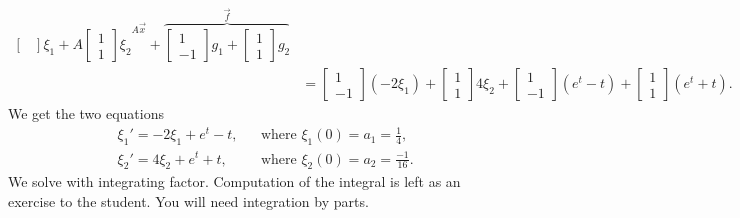 \documentclass{ximera}
\begin{document}
\begin{exampleSol}
\begin{equation*}
\begin{split}
{\begin{bmatrix}
                \end{bmatrix} 
                \xi_1 +
                A
                \begin{bmatrix}
                    1 \\
                    1
                \end{bmatrix} 
                \xi_2
            }^{A\vec{x}} +
            \overbrace{
                \begin{bmatrix}
                    1 \\
                    -1
                \end{bmatrix} 
                g_1 +
                \begin{bmatrix}
                    1 \\
                    1
                \end{bmatrix} 
                g_2
            }^{\vec{f}}
            \\
            & =
            \begin{bmatrix}
                1 \\
                -1
            \end{bmatrix} 
            (-2\xi_1) +
            \begin{bmatrix}
                1 \\
                1
            \end{bmatrix} 
            4\xi_2 +
            \begin{bmatrix}
                1 \\
                -1
            \end{bmatrix} 
            (e^t - t) +
            \begin{bmatrix}
                1 \\
                1
            \end{bmatrix} 
            (e^t + t) .
        \end{split}
    \end{equation*}
    We get the two equations
    \begin{align*}
        & \xi_1' = -2\xi_1 + e^t -t, & & \text{where } \xi_1(0) = a_1 = \frac{1}{4} , \\
        & \xi_2' = 4\xi_2 + e^t + t, & & \text{where } \xi_2(0) = a_2 = \frac{-1}{16} .
    \end{align*}
        We solve with integrating factor.  Computation of the integral is left as an exercise to the student.  You will need integration by parts.
    \begin{equation*}

\end{equation*}
\end{exampleSol}
\end{document}
